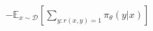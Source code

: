 \documentclass[preview]{standalone}
\begin{document}
\begin{align*}
-\mathbb{E}_{x \sim \mathcal{D}}\left[\sum_{y:r(x,y)=1}\pi_\theta(y|x)\right]
\end{align*}
\end{document}
